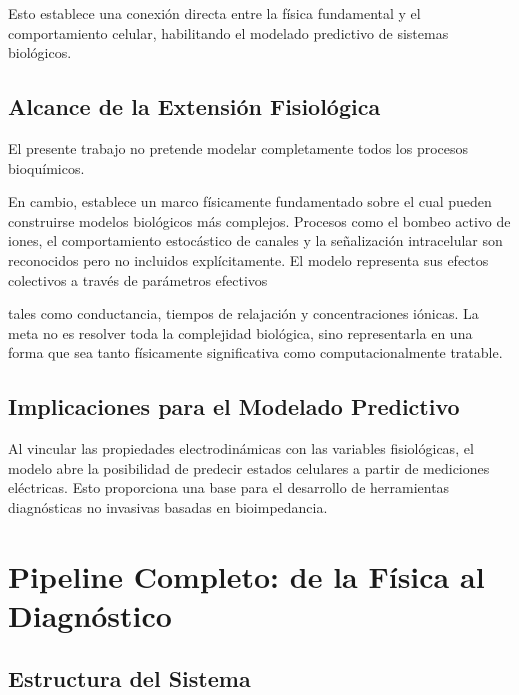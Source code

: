\documentclass[12pt]{article}
\begin{document}
Esto establece una conexi\'on directa entre la f\'isica fundamental y el comportamiento celular,
habilitando el modelado predictivo de sistemas biol\'ogicos.

\subsection{Alcance de la Extensi\'on Fisiol\'ogica}
El presente trabajo no pretende modelar completamente todos los procesos bioqu\'imicos.

En cambio, establece un marco f\'isicamente fundamentado sobre el cual pueden construirse
modelos biol\'ogicos m\'as complejos. Procesos como el bombeo activo de iones, el
comportamiento estoc\'astico de canales y la se\~{n}alizaci\'on intracelular son reconocidos pero
no incluidos
expl\'icitamente. El modelo representa sus efectos colectivos a trav\'es de par\'ametros efectivos

tales como conductancia, tiempos de relajaci\'on y concentraciones i\'onicas. La meta no es
resolver toda la complejidad biol\'ogica, sino representarla en una forma que sea tanto
f\'isicamente significativa como computacionalmente tratable.

\subsection{Implicaciones para el Modelado Predictivo}

Al vincular las propiedades electrodin\'amicas con las variables fisiol\'ogicas, el modelo
abre la posibilidad de predecir estados celulares a partir de mediciones el\'ectricas. Esto
proporciona una base para el desarrollo de herramientas diagn\'osticas no invasivas basadas
en bioimpedancia.


\section{Pipeline Completo: de la F\'isica al Diagn\'ostico}

\label{sec:pipeline}


\subsection{Estructura del Sistema}
\end{document}
